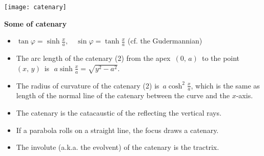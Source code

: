 \documentclass[12pt]{article}
\theoremstyle{definition}
\begin{document}
\begin{center}
\texttt{[image: catenary]}
\end{center}

\textbf{Some  of catenary}
\begin{itemize}
\item $\tan\varphi = \sinh\frac{x}{a}, \quad \sin\varphi = \tanh\frac{x}{a}$ \quad (cf. the Gudermannian)
\item The arc length of the catenary (2) from the apex\, $(0,\,a)$\, to the point\, $(x,\,y)$\, is\,\, $a\sinh\frac{x}{a} = \sqrt{y^2\!-\!a^2}$.
\item The radius of curvature of the catenary (2) is\, $a\cosh^2\frac{x}{a}$, which is the same as length of the normal line of the catenary between the curve and the $x$-axis.
\item The catenary is the catacaustic of the  reflecting the vertical rays.
\item If a parabola rolls on a straight line, the focus draws a catenary.
\item The involute (a.k.a. the evolvent) of the catenary is the tractrix.
\end{itemize}
\end{document}

